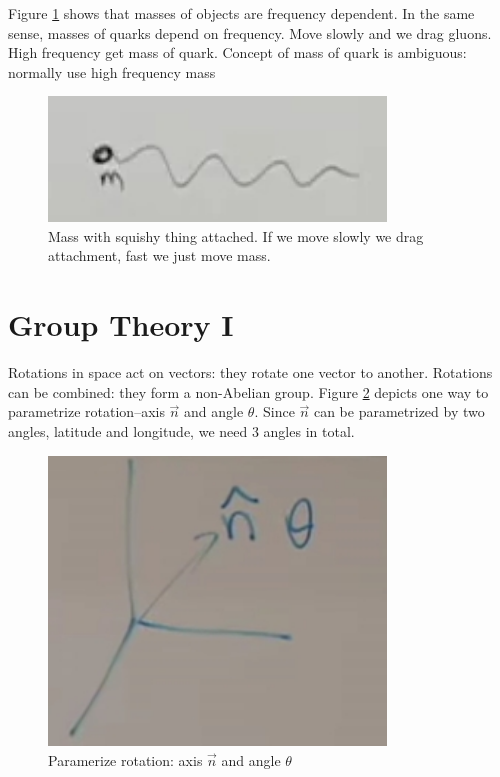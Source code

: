 \documentclass[]{article}
\begin{document}
Figure \ref{fig:2-2-mass1} shows that masses of objects are frequency dependent. In the same sense, masses of quarks depend on frequency. Move slowly and we drag gluons. High frequency get mass of quark. Concept of mass of quark is ambiguous: normally use high frequency mass
\begin{figure}[H]
	\caption[Mass with squishy thing attached]{Mass with squishy thing attached. If we move slowly we drag attachment, fast we just move mass.}\label{fig:2-2-mass1}
	\includegraphics[width=0.8\textwidth]{2-2-mass1}
\end{figure}


\section{Group Theory I}

Rotations in space act on vectors: they rotate one vector to another. Rotations can be combined: they form a non-Abelian group. Figure \ref{fig:2-3-paramerize-rotation} depicts one way to parametrize rotation--axis $\vec{n}$ and angle $\theta$. Since $\vec{n}$ can be parametrized by two angles, latitude and longitude, we need 3 angles in total.

\begin{figure}[H]
	\caption{Paramerize rotation: axis $\vec{n}$ and angle $\theta$}\label{fig:2-3-paramerize-rotation}
	\includegraphics[width=0.8\textwidth]{2-3-paramerize-rotation}
\end{figure}
\end{document}
